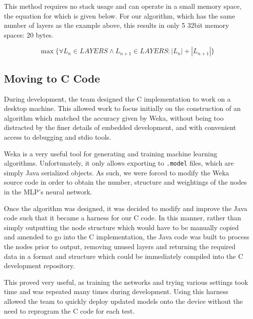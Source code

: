 This method requires no stack usage and can operate in a small memory space, the equation for which is given below. For our algorithm, which has the same number of layers as the example above, this results in only 5 32bit memory spaces: 20 bytes.

\begin{equation}
\label{eq:algo-size}
\max\{\forall L_n \in LAYERS \wedge L_{n+1} \in LAYERS : |L_n|+|L_{n+1}|\}
\end{equation}

\subsection{Moving to C Code}

During development, the team designed the C implementation to work on a desktop machine. This allowed work to focus initially on the construction of an algorithm which matched the accuracy given by Weka, without being too distracted by the finer details of embedded development, and with convenient access to debugging and stdio tools. 

Weka is a very useful tool for generating and training machine learning algorithms. Unfortunately, it only allows exporting to \verb|.model| files, which are simply Java serialized objects. As such, we were forced to modify the Weka source code in order to obtain the number, structure and weightings of the nodes in the MLP's neural network.

Once the algorithm was designed, it was decided to modify and improve the Java code such that it became a harness for our C code. In this manner, rather than simply outputting the node structure which would have to be manually copied and amended to go into the C implementation, the Java code was built to process the nodes prior to output, removing unused layers and returning the required data in a format and structure which could be immediately compiled into the C development repository.

This proved very useful, as training the networks and trying various settings took time and was repeated many times during development. Using this harness allowed the team to quickly deploy updated models onto the device without the need to reprogram the C code for each test.